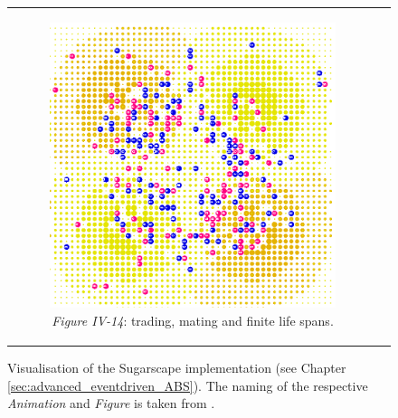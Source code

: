 \begin{figure}[H]
\begin{center}
\begin{tabular}{c c}
		\begin{subfigure}[b]{0.4\textwidth}
			\centering
			\includegraphics[width=1\textwidth, angle=0]{./fig/background/abs/sugarscape_trading_mating.png}
			\caption{\textit{Figure IV-14}: trading, mating and finite life spans.}
			\label{fig:sugarscape_visualisation_trading_mating}
		\end{subfigure}
	\end{tabular}
	
	\caption{Visualisation of the Sugarscape implementation (see Chapter \ref{sec:advanced_eventdriven_ABS}). The naming of the respective \textit{Animation} and \textit{Figure} is taken from \cite{epstein_growing_1996}.} 
	\label{fig:sugarscape_visualisation}
\end{center}
\end{figure}